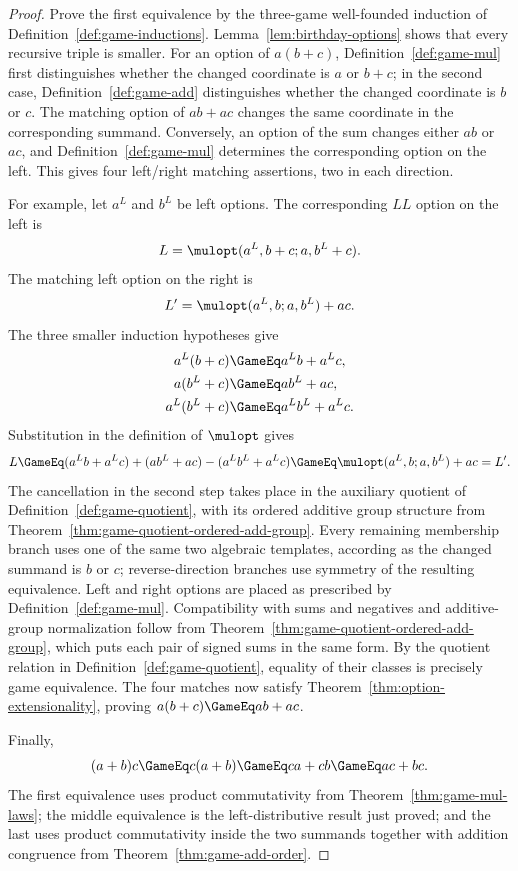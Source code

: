 \begin{proof}
  \leanok
  Prove the first equivalence by the three-game well-founded induction of
  Definition~\ref{def:game-inductions}.  Lemma~\ref{lem:birthday-options}
  shows that every recursive triple is smaller.  For an option of
  \(a(b+c)\), Definition~\ref{def:game-mul} first distinguishes whether the
  changed coordinate is \(a\) or \(b+c\); in the second case,
  Definition~\ref{def:game-add} distinguishes whether the changed coordinate
  is \(b\) or \(c\).  The matching option of \(ab+ac\) changes the same
  coordinate in the corresponding summand.  Conversely, an option of the sum
  changes either \(ab\) or \(ac\), and Definition~\ref{def:game-mul}
  determines the corresponding option on the left.  This gives four
  left/right matching assertions, two in each direction.

  For example, let \(a^L\) and \(b^L\) be left options.  The corresponding
  \(LL\) option on the left is
  \[
    L=\mulopt(a^L,b+c;a,b^L+c).
  \]
  The matching left option on the right is
  \[
    L'=\mulopt(a^L,b;a,b^L)+ac.
  \]
  The three smaller induction hypotheses give
  \[
    \begin{aligned}
      a^L(b+c)&\GameEq a^Lb+a^Lc,\\
      a(b^L+c)&\GameEq ab^L+ac,\\
      a^L(b^L+c)&\GameEq a^Lb^L+a^Lc.
    \end{aligned}
  \]
  Substitution in the definition of \(\mulopt\) gives
  \[
    L\GameEq
      (a^Lb+a^Lc)+(ab^L+ac)-(a^Lb^L+a^Lc)
      \GameEq \mulopt(a^L,b;a,b^L)+ac=L'.
  \]
  The cancellation in the second step takes place in the auxiliary quotient of
  Definition~\ref{def:game-quotient}, with its ordered additive group structure from
  Theorem~\ref{thm:game-quotient-ordered-add-group}.  Every remaining
  membership branch uses one of the same two algebraic templates, according
  as the changed summand is \(b\) or \(c\); reverse-direction branches use
  symmetry of the resulting equivalence.  Left and right options are placed
  as prescribed by Definition~\ref{def:game-mul}.  Compatibility with sums and negatives
  and additive-group normalization follow from
  Theorem~\ref{thm:game-quotient-ordered-add-group}, which puts each pair of signed sums
  in the same form.  By the
  quotient relation in
  Definition~\ref{def:game-quotient}, equality of their classes is precisely
  game equivalence.  The four matches now satisfy
  Theorem~\ref{thm:option-extensionality}, proving
  \(a(b+c)\GameEq ab+ac\).

  Finally,
  \[
    (a+b)c\GameEq c(a+b)\GameEq ca+cb\GameEq ac+bc.
  \]
  The first equivalence uses product commutativity from
  Theorem~\ref{thm:game-mul-laws}; the middle equivalence is the
  left-distributive result just proved; and the last uses product
  commutativity inside the two summands together with addition congruence from
  Theorem~\ref{thm:game-add-order}.
\end{proof}

